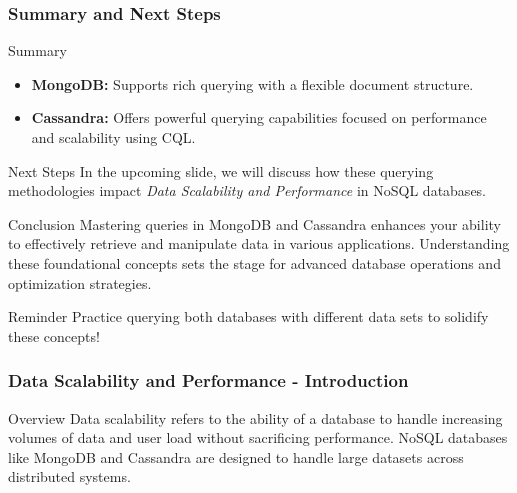 \documentclass[aspectratio=169]{beamer}
\begin{document}
\begin{frame}
    \frametitle{Summary and Next Steps}
    \begin{block}{Summary}
        \begin{itemize}
            \item \textbf{MongoDB:} Supports rich querying with a flexible document structure.
            \item \textbf{Cassandra:} Offers powerful querying capabilities focused on performance and scalability using CQL.
        \end{itemize}
    \end{block}
    
    \begin{block}{Next Steps}
        In the upcoming slide, we will discuss how these querying methodologies impact 
        \textit{Data Scalability and Performance} in NoSQL databases.
    \end{block}

    \begin{block}{Conclusion}
        Mastering queries in MongoDB and Cassandra enhances your ability to effectively retrieve and manipulate data in various applications.
        Understanding these foundational concepts sets the stage for advanced database operations and optimization strategies.
    \end{block}
    
    \begin{alertblock}{Reminder}
        Practice querying both databases with different data sets to solidify these concepts!
    \end{alertblock}
\end{frame}

\begin{frame}[fragile]
  \frametitle{Data Scalability and Performance - Introduction}
  \begin{block}{Overview}
    Data scalability refers to the ability of a database to handle increasing volumes of data and user load without sacrificing performance.
    NoSQL databases like MongoDB and Cassandra are designed to handle large datasets across distributed systems.
  \end{block}
\end{frame}
\end{document}
